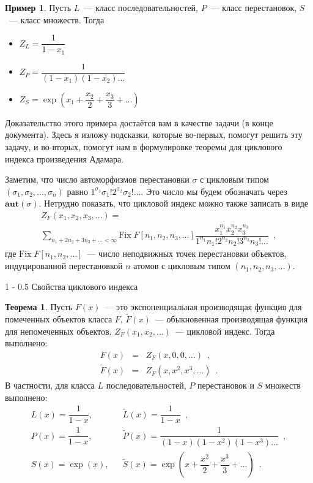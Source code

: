 \documentclass[a5paper]{article}
\makeatletter
\theoremstyle{definition}
\newtheorem{example}{Пример}
\newtheorem*{theorem}{Теорема}
\renewcommand{\subsection}{\@startsection
{subsection}%
{1}%
{\z@}%
{-\baselineskip}%
{0.5\baselineskip}%
{\centering\large\scshape}} %
\makeatother
\begin{document}
\begin{example}
	Пусть \( L \)~--- класс последовательностей, \( P \)~--- класс 
	перестановок, \( S \)~--- класс множеств. Тогда
	\begin{itemize}
		\item	\( Z_L = \dfrac{1}{1 - x_1} \)
		\item 	\( Z_P = \dfrac{1}{(1-x_1)(1-x_2)\ldots} \)
		\item   \( Z_S = \exp \left(
			x_1 + \dfrac{x_2}{2} + \dfrac{x_3}{3} + \ldots
		\right) \)
	\end{itemize}
\end{example}

Доказательство этого примера достаётся вам в качестве задачи (в конце
документа). Здесь я изложу подсказки, которые во-первых, помогут решить эту
задачу, и во-вторых, помогут нам в формулировке теоремы для циклового индекса
произведения Адамара.

Заметим, что число автоморфизмов перестановки \( \sigma \) с цикловым типом \(
(\sigma_1, \sigma_2, \ldots, \sigma_n) \) равно \( 1^{\sigma_1}
\sigma_1! 2^{\sigma_2} \sigma_2! \ldots \). Это число мы будем обозначать через
\( \mathbf{aut}(\sigma) \). Нетрудно показать, что цикловой индекс можно также
записать в виде
\begin{multline*}
    Z_F(x_1, x_2, x_3, \ldots) =\\ \sum_{n_1 + 2n_2 + 3n_3 + \ldots < \infty}
\mathrm{Fix}\; F[n_1, n_2, n_3, \ldots] \dfrac{x_1^{n_1} x_2^{n_2}
x_3^{n_3}}{1^{n_1} n_1! 2^{n_2} n_2! 3^{n_3} n_3! \ldots} \enspace ,
\end{multline*}
где \( \mathrm{Fix}\; F[n_1, n_2, \ldots] \)~--- число неподвижных точек
перестановки объектов, индуцированной перестановкой \( n \) атомов с цикловым типом \(
(n_1, n_2, n_3, \ldots ) \).
\subsection{Свойства циклового индекса}

\begin{theorem}
Пусть \( F(x) \)~--- это экспоненциальная производящая функция для помеченных
объектов класса \( F \), \( \widetilde F(x) \)~--- обыкновенная производящая
функция для непомеченных объектов, \( Z_F(x_1, x_2, \ldots) \)~--- цикловой
индекс. Тогда выполнено:
\begin{eqnarray*}
    F(x) &=&  Z_F(x, 0, 0, \ldots) \enspace , \\ 
    \widetilde F(x) &=& Z_F(x, x^2, x^3, \ldots) \enspace . 
\end{eqnarray*}
В частности, для класса \( L \) последовательностей, \( P \) перестановок и \( S
\) множеств выполнено:
\begin{eqnarray*}
    L(x) = \dfrac{1}{1 - x}, && \widetilde L(x) = \dfrac{1}{1-x}\enspace  , \\
    P(x) = \dfrac{1}{1 - x}, && \widetilde P(x) = \dfrac{1}{(1-x)(1 - x^2)(1 -
x^3) \ldots} \enspace , \\
    S(x) = \exp(x), &  &
\widetilde S(x) = \exp\left( x + \dfrac{x^2}{2} + \dfrac{x^3}{3} + \ldots
\right) \enspace .
\end{eqnarray*}
\end{theorem}
\end{document}
